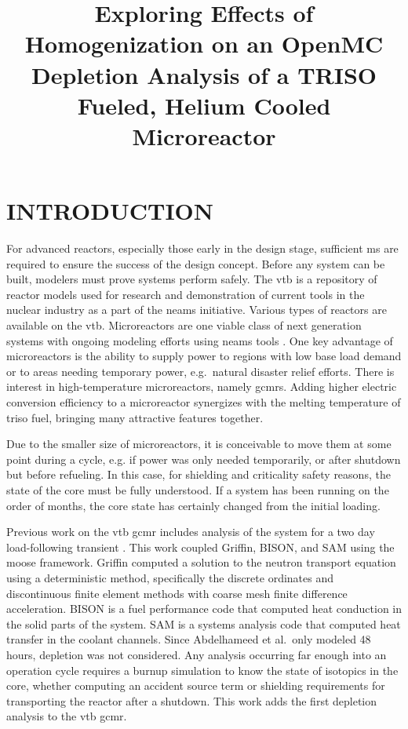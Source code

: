 \documentclass[letterpaper]{physor2024}
\title{Exploring Effects of Homogenization on an OpenMC Depletion Analysis of a TRISO Fueled, Helium Cooled Microreactor}
\begin{document}
\section{INTRODUCTION}\label{sec:intro}
For advanced reactors, especially those early in the design stage, sufficient \gls{ms} are required to ensure the success of the design concept. Before any system can be built, modelers must prove systems perform safely. The \gls{vtb} \cite{vtb2023} is a repository of reactor models used for research and demonstration of current tools in the nuclear industry as a part of the \gls{neams} initiative. Various types of reactors are available on the \gls{vtb}. Microreactors are one viable class of next generation systems with ongoing modeling efforts using \gls{neams} tools \cite{Stauff-preliminary-applications-2021, Stauff-applications-2022, Abdelhameed-ANS-2022}. One key advantage of microreactors is the ability to supply power to regions with low base load demand or to areas needing temporary power, e.g.~natural disaster relief efforts. There is interest in high-temperature microreactors, namely \glspl{gcmr}. Adding higher electric conversion efficiency to a microreactor synergizes with the melting temperature of \gls{triso} fuel, bringing many attractive features together.

Due to the smaller size of microreactors, it is conceivable to move them at some point during a cycle, e.g. if power was only needed temporarily, or after shutdown but before refueling. In this case, for shielding and criticality safety reasons, the state of the core must be fully understood. If a system has been running on the order of months, the core state has certainly changed from the initial loading.

Previous work on the \gls{vtb} \gls{gcmr} includes analysis of the system for a two day load-following transient \cite{Abdelhameed-ANS-2022}. This work coupled Griffin, BISON, and SAM using the \gls{moose} framework. Griffin computed a solution to the neutron transport equation using a deterministic method, specifically the discrete ordinates and discontinuous finite element methods with coarse mesh finite difference acceleration. BISON is a fuel performance code that computed heat conduction in the solid parts of the system. SAM is a systems analysis code that computed heat transfer in the coolant channels. Since Abdelhameed et al.~only modeled 48 hours, depletion was not considered. Any analysis occurring far enough into an operation cycle requires a burnup simulation to know the state of isotopics in the core, whether computing an accident source term or shielding requirements for transporting the reactor after a shutdown. This work adds the first depletion analysis to the \gls{vtb} \gls{gcmr}.
\end{document}
